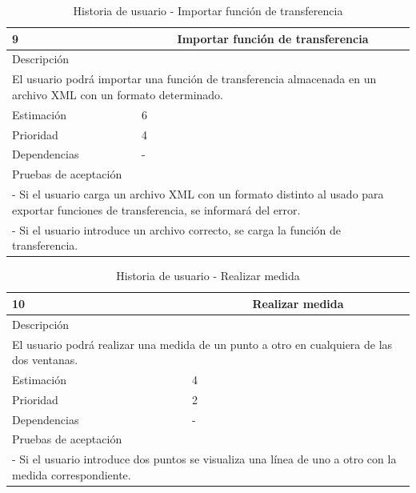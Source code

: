 \begin{table}[H]
	\begin{center}
		\begin{tabular} {|l|c|l|}
			\hline
			9 & \multicolumn{2}{c|}{Importar función de transferencia} \\ \hline \hline
			\multicolumn{3}{|l|}{Descripción} \\ \hline
			\multicolumn{3}{|p{12cm}|}{El usuario podrá importar una función de transferencia almacenada en un archivo XML con un formato determinado.} \\ \hline
			\multicolumn{2}{|l|}{Estimación} & 6 \\ \hline
			\multicolumn{2}{|l|}{Prioridad} & 4 \\ \hline
			\multicolumn{2}{|l|}{Dependencias} & - \\ \hline
			\multicolumn{3}{|l|}{Pruebas de aceptación} \\ \hline
			\multicolumn{3}{|p{12cm}|}{ - Si el usuario carga un archivo XML con un formato distinto al usado para exportar funciones de transferencia, se informará del error.} \\
			\multicolumn{3}{|p{12cm}|}{ - Si el usuario introduce un archivo correcto, se carga la función de transferencia.} \\ \hline
		\end{tabular}
	\end{center}
	\caption{Historia de usuario - Importar función de transferencia}
	\label{tab:hu_importar_funcion_de_transferencia}
\end{table}

\begin{table}[H]
	\begin{center}
		\begin{tabular} {|l|c|l|}
			\hline
			10 & \multicolumn{2}{c|}{Realizar medida} \\ \hline \hline
			\multicolumn{3}{|l|}{Descripción} \\ \hline
			\multicolumn{3}{|p{12cm}|}{El usuario podrá realizar una medida de un punto a otro en cualquiera de las dos ventanas.} \\ \hline
			\multicolumn{2}{|l|}{Estimación} & 4 \\ \hline
			\multicolumn{2}{|l|}{Prioridad} & 2 \\ \hline
			\multicolumn{2}{|l|}{Dependencias} & - \\ \hline
			\multicolumn{3}{|l|}{Pruebas de aceptación} \\ \hline
			\multicolumn{3}{|p{12cm}|}{ - Si el usuario introduce dos puntos se visualiza una línea de uno a otro con la medida correspondiente.} \\ \hline
		\end{tabular}
	\end{center}
	\caption{Historia de usuario - Realizar medida}
	\label{tab:hu_realizar_medida}
\end{table}

